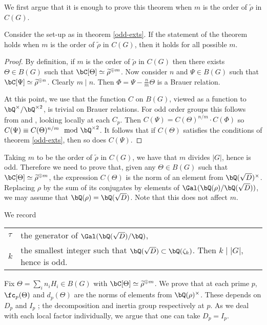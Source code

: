 
We first argue that it is enough to prove this theorem when $m$ is the order of $\widetilde{\rho}$ in $C(G)$. 

\begin{lemma}
    Consider the set-up as in theorem \ref{odd-exts}. If the statement of the theorem holds when $m$ is the order of $\widetilde{\rho}$ in $C(G)$, then it holds for all possible $m$.
\end{lemma}

\begin{proof}
    By definition, if $m$ is the order of $\widetilde{\rho}$ in $C(G)$ then there exists $\Theta \in B(G)$ such that $\bC[\Theta] \simeq \widetilde{\rho}^{\oplus m}$.
    Now consider $n$ and $\Psi \in B(G)$ such that $\bC[\Psi] \simeq \widetilde{\rho}^{\oplus n}$. Clearly $m \mid n$.  Then $\Phi = \Psi - \frac{n}{m}\Theta$ is a Brauer relation.

    At this point, we use that the function $C$ on $B(G)$, viewed as a function to $\bQ^{\times} / \bQ^{\times 2}$, is trivial on Brauer relations. For odd order groups this follows from \cite[Theorem 2.47]{reg-const} and \cite[Theorem 3.2  (Tam)]{reg-const}, looking locally at each $C_p$. 
    Then $C(\Psi) = C(\Theta)^{n / m} \cdot C(\Phi)$ so $C(\Psi) \equiv C(\Theta)^{n / m} \mod \bQ^{\times 2}$. It follows that if $C(\Theta)$ satisfies the conditions of theorem \ref{odd-exts}, then so does $C(\Psi)$.
\end{proof}

Taking $m$ to be the order of $\widetilde{\rho}$ in $C(G)$, we have that $m$ divides $|G|$, hence is odd. Therefore we need to prove that, given any $
\Theta \in B(G)$ such that $\bC[\Theta] \simeq \widetilde{\rho}^{\oplus m}$, the expression $C(\Theta)$ is the norm of an element from $\bQ(\sqrt{D})^{\times}$.
Replacing $\rho$ by the sum of its conjugates by elements of $ \Gal(\bQ(\rho) / \bQ(\sqrt{D}))$, we may assume that $\bQ(\rho) = \bQ(\sqrt{D})$. Note that this does not affect $m$. 

We record
\begin{table}[H]
         \vspace{-1em}
         \setlength\itemsep{0em}
        \centering
\begin{tabular}{l l}
    $\tau$ & the generator of $\Gal(\bQ(\sqrt{D}) / \bQ)$, \\
    $k$ & the smallest integer such that $\bQ(\sqrt{D}) \subset \bQ(\zeta_k)$. Then $k \mid |G|$, hence is odd.
\end{tabular}
\vspace{-1em}
\end{table}
Fix $\Theta = \sum_i n_i H_i \in B(G)$ with $\bC[\Theta] \simeq \widetilde{\rho}^{\oplus m}$. We prove that at each prime $p$, $\fc_p(\Theta)$ and $d_p(\Theta)$ are the norms of elements from $\bQ(\rho)^{\times}$.  These depends on $D_p$ and $I_p$ ; the decomposition and inertia group respectively at $p$. As we deal with each local factor individually, we argue that one can take $D_p = I_p$.

